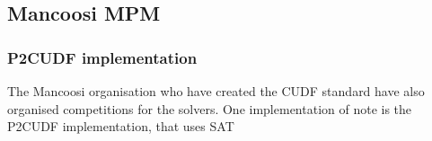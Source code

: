 


\subsection{Mancoosi MPM}


\subsubsection{P2CUDF implementation}
The Mancoosi organisation who have created the CUDF standard have also organised competitions for the solvers.
One implementation of note is the P2CUDF implementation, that uses SAT


